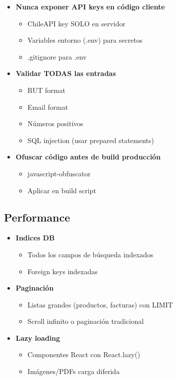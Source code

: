 \documentclass[11pt,a4paper]{article}
\begin{document}
\begin{itemize}
    \item \textbf{Nunca exponer API keys en código cliente}
    \begin{itemize}
        \item ChileAPI key SOLO en servidor
        \item Variables entorno (.env) para secretos
        \item .gitignore para .env
    \end{itemize}
    
    \item \textbf{Validar TODAS las entradas}
    \begin{itemize}
        \item RUT format
        \item Email format
        \item Números positivos
        \item SQL injection (usar prepared statements)
    \end{itemize}
    
    \item \textbf{Ofuscar código antes de build producción}
    \begin{itemize}
        \item javascript-obfuscator
        \item Aplicar en build script
    \end{itemize}
\end{itemize}

\subsection{Performance}

\begin{itemize}
    \item \textbf{Indices DB}
    \begin{itemize}
        \item Todos los campos de búsqueda indexados
        \item Foreign keys indexadas
    \end{itemize}
    
    \item \textbf{Paginación}
    \begin{itemize}
        \item Listas grandes (productos, facturas) con LIMIT
        \item Scroll infinito o paginación tradicional
    \end{itemize}
    
    \item \textbf{Lazy loading}
    \begin{itemize}
        \item Componentes React con React.lazy()
        \item Imágenes/PDFs carga diferida
    \end{itemize}
\end{itemize}
\end{document}
